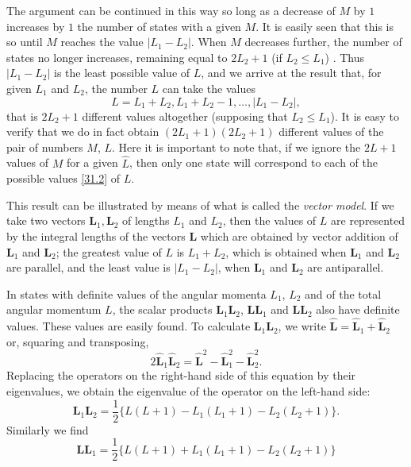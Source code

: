 The argument can be continued in this way so long as a decrease of $ M $ by $ 1 $ increases by $ 1 $ the number of states with a given $ M $. It is easily seen that this is so until $ M $ reaches the value $ |L_1 - L_2| $. When $ M $ decreases further, the number of states no longer increases, remaining equal to $ 2L_2 + 1$ (if $ L_2 \leqslant L_1 $) . Thus $ |L_1 - L_2| $ is the least possible value of $ L $, and we arrive at the result that, for given $ L_1 $ and $ L_2 $, the number $ L $ can take the values
\begin{equation}\label{31.2}
L=L_1+L_2,L_1+L_2-1,\dots,|L_1-L_2|,
\end{equation}
that is $ 2L_2 + 1 $ different values altogether (supposing that $ L_2 \leqslant L_1 $). It is easy to verify that we do in fact obtain $ (2L_1 + 1)(2L_2+1) $ different values of the pair of numbers $ M $, $ L $. Here it is important to note that, if we ignore the $ 2L + 1 $ values of $ M $ for a given $ \hat{L} $, then only one state will correspond to each of the possible values \eqref{31.2} of $ L $.

This result can be illustrated by means of what is called the \textit{vector model}. If we take two vectors $ \bm{L}_1, \bm{L}_2 $ of lengths $ L_1 $ and $ L_2 $, then the values of $ L $ are represented by the integral lengths of the vectors $ \bm{L} $ which are obtained by vector addition of $ \bm{L}_1 $ and $ \bm{L}_2 $; the greatest value of $ L $ is $ L_1 + L_2 $, which is obtained when $ \bm{L}_1 $ and $ \bm{L}_2 $ are parallel, and the least value is $ |L_1 - L_2| $, when $ \bm{L}_1 $ and $ \bm{L}_2 $ are antiparallel.

In states with definite values of the angular momenta $ L_1 $, $ L_2 $ and of the total angular momentum $ L $, the scalar products $ \bm{L}_1\bm{L}_2 $, $ \bm{L}\bm{L}_1 $ and $ \bm{L}\bm{L}_2 $ also have definite values. These values are easily found. To calculate $ \bm{L}_1\bm{L}_2 $, we write $ \hat{\bm{L}}=\hat{\bm{L}}_1+\hat{\bm{L}}_2 $ or, squaring and transposing,
\[ 2\hat{\bm{L}}_1\hat{\bm{L}}_2=\hat{\bm{L}}^2-\hat{\bm{L}}_1^2-\hat{\bm{L}}_2^2. \]
Replacing the operators on the right-hand side of this equation by their eigenvalues, we obtain the eigenvalue of the operator on the left-hand side:
\begin{equation}\label{31.3}
\bm{L}_1\bm{L}_2=\frac{1}{2}\{ L(L+1)-L_1(L_1+1)-L_2(L_2+1) \}.
\end{equation}
Similarly we find
\begin{equation}\label{31.4}
\bm{L}\bm{L}_1=\frac{1}{2}\{L(L+1)+L_1(L_1+1)-L_2(L_2+1) \}
\end{equation}



